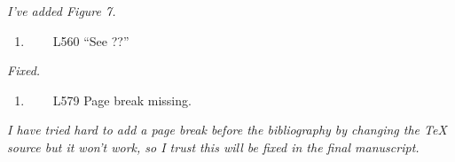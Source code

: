 \documentclass[]{article}
\providecommand{\tightlist}{%
  \setlength{\itemsep}{0pt}\setlength{\parskip}{0pt}}
\begin{document}
\begin{adjustwidth}{1cm}{} \textit{
I've added Figure 7.
} \end{adjustwidth}

\begin{enumerate}
\def\labelenumi{\arabic{enumi}.}
\setcounter{enumi}{20}
\tightlist
\item
  ~~~~L560 ``See ??''
\end{enumerate}

\begin{adjustwidth}{1cm}{} \textit{
Fixed.
} \end{adjustwidth}

\begin{enumerate}
\def\labelenumi{\arabic{enumi}.}
\setcounter{enumi}{21}
\tightlist
\item
  ~~~~L579 Page break missing.
\end{enumerate}

\begin{adjustwidth}{1cm}{} \textit{
I have tried hard to add a page break before the bibliography by changing the TeX source but it won't work, so I trust this will be fixed in the final manuscript.
} \end{adjustwidth}
\end{document}
